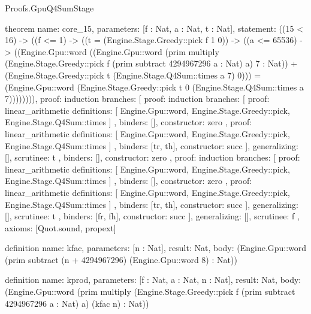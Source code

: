 \begin{lexlean}{Proofs.GpuQ4SumStage}
\begin{semanticmodule}
theorem{
  name: core_15,
  parameters: [f : Nat, a : Nat, t : Nat],
  statement: ((15 < 16) -> ((f <= 1) -> ((t = (Engine.Stage.Greedy::pick f 1 0)) -> ((a <= 65536) -> ((Engine.Gpu::word ((Engine.Gpu::word (prim multiply (Engine.Stage.Greedy::pick f (prim subtract 4294967296 a : Nat) a) 7 : Nat)) + (Engine.Stage.Greedy::pick t (Engine.Stage.Q4Sum::times a 7) 0))) = (Engine.Gpu::word (Engine.Stage.Greedy::pick t 0 (Engine.Stage.Q4Sum::times a 7)))))))),
  proof: induction{
    branches: [
      {
        proof: induction{
          branches: [
            {
              proof: linear_arithmetic{
                definitions: [
                  Engine.Gpu::word,
                  Engine.Stage.Greedy::pick,
                  Engine.Stage.Q4Sum::times
                ]
              },
              binders: [],
              constructor: zero
            },
            {
              proof: linear_arithmetic{
                definitions: [
                  Engine.Gpu::word,
                  Engine.Stage.Greedy::pick,
                  Engine.Stage.Q4Sum::times
                ]
              },
              binders: [tr, th],
              constructor: succ
            }
          ],
          generalizing: [],
          scrutinee: t
        },
        binders: [],
        constructor: zero
      },
      {
        proof: induction{
          branches: [
            {
              proof: linear_arithmetic{
                definitions: [
                  Engine.Gpu::word,
                  Engine.Stage.Greedy::pick,
                  Engine.Stage.Q4Sum::times
                ]
              },
              binders: [],
              constructor: zero
            },
            {
              proof: linear_arithmetic{
                definitions: [
                  Engine.Gpu::word,
                  Engine.Stage.Greedy::pick,
                  Engine.Stage.Q4Sum::times
                ]
              },
              binders: [tr, th],
              constructor: succ
            }
          ],
          generalizing: [],
          scrutinee: t
        },
        binders: [fr, fh],
        constructor: succ
      }
    ],
    generalizing: [],
    scrutinee: f
  },
  axioms: [Quot.sound, propext]
}

definition{
  name: kfac,
  parameters: [n : Nat],
  result: Nat,
  body: (Engine.Gpu::word (prim subtract (n + 4294967296) (Engine.Gpu::word 8) : Nat))
}

definition{
  name: kprod,
  parameters: [f : Nat, a : Nat, n : Nat],
  result: Nat,
  body: (Engine.Gpu::word (prim multiply (Engine.Stage.Greedy::pick f (prim subtract 4294967296 a : Nat) a) (kfac n) : Nat))
}


\end{semanticmodule}
\end{lexlean}
